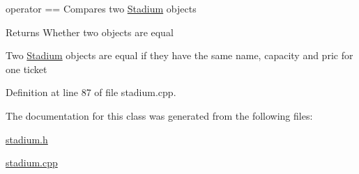 operator == Compares two \hyperlink{class_stadium}{Stadium} objects 

\begin{DoxyReturn}{Returns}
Whether two objects are equal
\end{DoxyReturn}
Two \hyperlink{class_stadium}{Stadium} objects are equal if they have the same name, capacity and pric for one ticket 

Definition at line 87 of file stadium.\-cpp.



The documentation for this class was generated from the following files\-:\begin{DoxyCompactItemize}
\item 
\hyperlink{stadium_8h}{stadium.\-h}\item 
\hyperlink{stadium_8cpp}{stadium.\-cpp}\end{DoxyCompactItemize}
